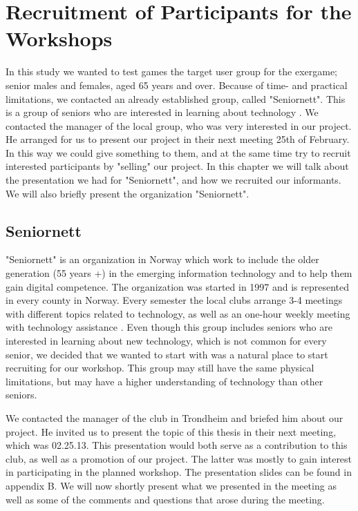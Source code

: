 \chapter{Recruitment of Participants for the Workshops}
In this study we wanted to test games the target user group for the exergame; senior males and females, aged 65 years and over. Because of time- and practical limitations, we contacted an already established group, called "Seniornett". This is a group of seniors who are interested in learning about technology \cite{seniornett}. We contacted the manager of the local group, who was very interested in our project. He arranged for us to present our project in their next meeting 25th of February. In this way we could give something to them, and at the same time try to recruit interested participants by "selling" our project. In this chapter we will talk about the presentation we had for "Seniornett", and how we recruited our informants. We will also briefly present the organization "Seniornett".


\section{Seniornett}
"Seniornett" is an organization in Norway which work to include the older generation (55 years +) in the emerging information technology and to help them gain digital competence. The organization was started in 1997 and is represented in every county in Norway.  Every semester the local clubs arrange 3-4 meetings with different topics related to technology, as well as an one-hour weekly meeting with technology assistance \cite{seniornett}. Even though this group includes seniors who are interested in learning about new technology, which is not common for every senior, we decided that we wanted to start with was a natural place to start recruiting for our workshop. This group may still have the same physical limitations, but may have a higher understanding of technology than other seniors. 

We contacted the manager of the club in Trondheim and briefed him about our project. He invited us to present the topic of this thesis in their next meeting, which was 02.25.13. This presentation would both serve as a contribution to this club, as well as a promotion of our project. The latter was mostly to gain interest in participating in the planned workshop. The presentation slides can be found in appendix B. We will now shortly present what we presented in the meeting as well as some of the comments and questions that arose during the meeting. 

